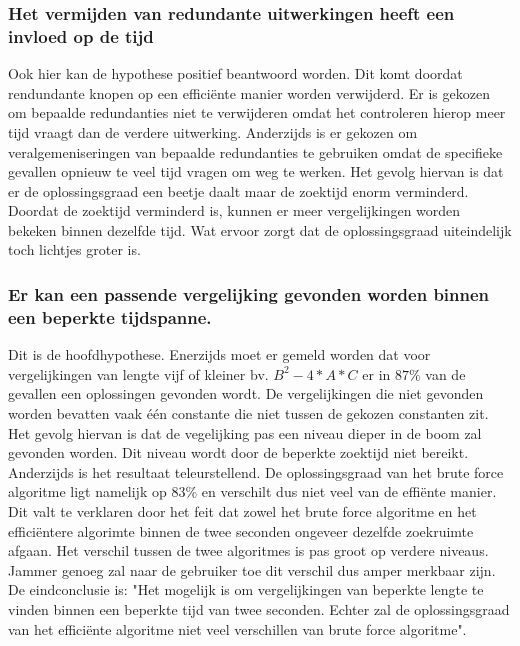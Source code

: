 \documentclass[Main.tex]{subfiles}
\begin{document}
\subsubsection{Het vermijden van redundante uitwerkingen heeft een invloed op de tijd}
Ook hier kan de hypothese positief beantwoord worden. Dit komt doordat rendundante knopen op een effici\"ente manier worden verwijderd. Er is gekozen om bepaalde redundanties niet te verwijderen omdat het controleren hierop meer tijd vraagt dan de verdere uitwerking. Anderzijds is er gekozen om veralgemeniseringen van bepaalde redundanties te gebruiken omdat de specifieke gevallen opnieuw te veel tijd vragen om weg te werken. Het gevolg hiervan is dat er de oplossingsgraad een beetje daalt maar de zoektijd enorm verminderd. Doordat de zoektijd verminderd is, kunnen er meer vergelijkingen worden bekeken binnen dezelfde tijd. Wat ervoor zorgt dat de oplossingsgraad uiteindelijk toch lichtjes groter is.
\subsubsection{Er kan een passende vergelijking gevonden worden binnen een beperkte tijdspanne.}
Dit is de hoofdhypothese. Enerzijds moet er gemeld worden dat voor vergelijkingen van lengte vijf of kleiner bv. $B^{2} - 4 \ast A \ast C$ er in $87\%$ van de gevallen een oplossingen gevonden wordt. De vergelijkingen die niet gevonden worden bevatten vaak \'e\'en constante die niet tussen de gekozen constanten zit. Het gevolg hiervan is dat de vegelijking pas een niveau dieper in de boom zal gevonden worden. Dit niveau wordt door de beperkte zoektijd niet bereikt. Anderzijds is het resultaat teleurstellend. De oplossingsgraad van het brute force algoritme ligt namelijk op $83\%$ en verschilt dus niet veel van de effi\"ente manier. Dit valt te verklaren door het feit dat zowel het brute force algoritme en het effici\"entere algorimte binnen de twee seconden ongeveer dezelfde zoekruimte afgaan. Het verschil tussen de twee algoritmes is pas groot op verdere niveaus. Jammer genoeg zal naar de gebruiker toe dit verschil dus amper merkbaar zijn. De eindconclusie is: "Het mogelijk is om vergelijkingen van beperkte lengte te vinden binnen een beperkte tijd van twee seconden. Echter zal de oplossingsgraad van het effici\"ente algoritme niet veel verschillen van brute force algoritme".
\end{document}
